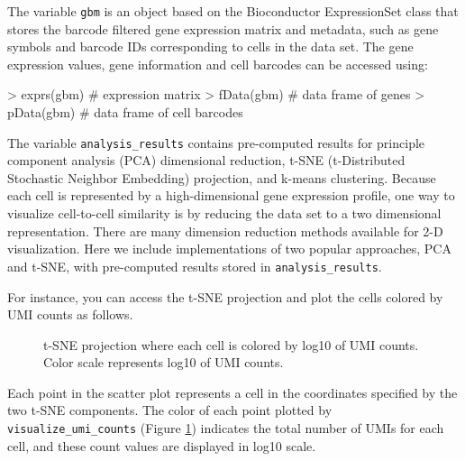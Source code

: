 \documentclass[10pt,oneside]{article}
\begin{document}
The variable \verb!gbm! is an object based on the Bioconductor ExpressionSet class that stores the barcode filtered gene expression matrix and metadata, such as gene symbols and barcode IDs corresponding to cells in the data set. The gene expression values, gene information and cell barcodes can be accessed using:
\begin{Schunk}
\begin{Sinput}
> exprs(gbm) # expression matrix
> fData(gbm) # data frame of genes
> pData(gbm) # data frame of cell barcodes
\end{Sinput}
\end{Schunk}
The variable \verb!analysis_results! contains pre-computed results for principle component analysis (PCA) dimensional reduction, t-SNE (t-Distributed Stochastic Neighbor Embedding) projection, and k-means clustering. Because each cell is represented by a high-dimensional gene expression profile, one way to visualize cell-to-cell similarity is by reducing the data set to a two dimensional representation. There are many dimension reduction methods available for 2-D visualization. Here we include implementations of two popular approaches, PCA and t-SNE, with pre-computed results stored in \verb!analysis_results!.

For instance, you can access the t-SNE projection and plot the cells colored by UMI counts as follows.

\begin{figure}[htbp]
\begin{center}
\begin{Schunk}
\end{Schunk}
\caption{t-SNE projection where each cell is colored by log10 of UMI counts. Color scale represents log10 of UMI counts.}
\label{fig:umi}
\end{center}
\end{figure}

\vspace{0.3in}

Each point in the scatter plot represents a cell in the coordinates specified by the two t-SNE components. The color of each point plotted by \verb!visualize_umi_counts! (Figure \ref{fig:umi}) indicates the total number of UMIs for each cell, and these count values are displayed in log10 scale.
\end{document}
